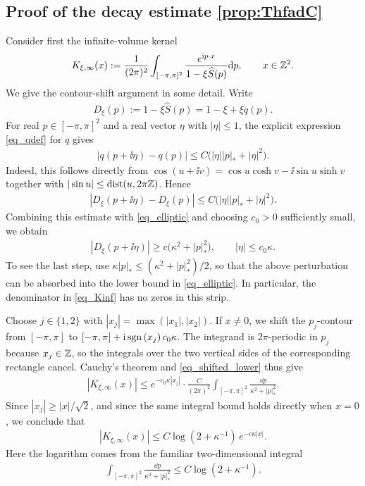 \subsection{Proof of the decay estimate \texorpdfstring{\eqref{prop:ThfadC}}{(5)}}

Consider first the infinite-volume kernel
%
\begin{align}
K_{\xi,\infty}(x):=\frac{1}{(2\pi)^{2}}\int_{[-\pi,\pi]^{2}}\frac{e^{\mathrm{i} p\cdot x}}{1-\xi\widehat{S}(p)}\mathrm{d} p,\qquad x\in\mathbb{Z}^{2}.\label{eq_Kinf}
\end{align}
%
We give the contour-shift argument in some detail. Write
%
\begin{align*}
D_{\xi}(p):=1-\xi\widehat{S}(p)=1-\xi+\xi q(p).
\end{align*}
%
For real $p\in[-\pi,\pi]^{2}$ and a real vector $\eta$ with $|\eta|\leq1$, the explicit expression \eqref{eq_qdef} for $q$ gives
%
\begin{align*}
|q(p+\ii\eta)-q(p)|\leq C\big(|\eta||p|_{*}+|\eta|^{2}\big).
\end{align*}
%
Indeed, this follows directly from $\cos(u+\ii v)=\cos u\cosh v-\ii\sin u\sinh v$ together with $|\sin u|\leq\mathrm{dist}(u,2\pi\mathbb{Z})$. Hence
%
\begin{align*}
|D_{\xi}(p+\ii\eta)-D_{\xi}(p)|\leq C\big(|\eta||p|_{*}+|\eta|^{2}\big).
\end{align*}
%
Combining this estimate with \eqref{eq_elliptic} and choosing $c_{0}>0$ sufficiently small, we obtain
%
\begin{align}
|D_{\xi}(p+\ii\eta)|\geq c\big(\kappa^{2}+|p|_{*}^{2}\big),\qquad |\eta|\leq c_{0}\kappa.\label{eq_shifted_lower}
\end{align}
%
To see the last step, use $\kappa|p|_{*}\leq(\kappa^{2}+|p|_{*}^{2})/2$, so that the above perturbation can be absorbed into the lower bound in \eqref{eq_elliptic}. In particular, the denominator in \eqref{eq_Kinf} has no zeros in this strip.

Choose $j\in\{1,2\}$ with $|x_{j}|=\max(|x_{1}|,|x_{2}|)$. If $x\neq0$, we shift the $p_{j}$-contour from $[-\pi,\pi]$ to $[-\pi,\pi]+\mathrm{i}\,{\operatorname{sgn}\,}(x_{j})\,c_{0}\kappa$. The integrand is $2\pi$-periodic in $p_{j}$ because $x_{j}\in\mathbb{Z}$, so the integrals over the two vertical sides of the corresponding rectangle cancel. Cauchy's theorem and \eqref{eq_shifted_lower} thus give
%
\begin{align*}
|K_{\xi,\infty}(x)|\leq e^{-c_{0}\kappa|x_{j}|}\cdot\frac{C}{(2\pi)^{2}}\int_{[-\pi,\pi]^{2}}\frac{\dd p}{\kappa^{2}+|p|_{*}^{2}}.
\end{align*}
%
Since $|x_{j}|\geq|x|/\sqrt2$, and since the same integral bound holds directly when $x=0$, we conclude that
%
\begin{align}
|K_{\xi,\infty}(x)|\leq C\log(2+\kappa^{-1})\,e^{-c\kappa|x|}.\label{eq_Kinf_bound}
\end{align}
%
Here the logarithm comes from the familiar two-dimensional integral
%
\begin{align}
\int_{[-\pi,\pi]^{2}}\frac{\dd p}{\kappa^{2}+|p|_{*}^{2}}\leq C\log(2+\kappa^{-1}).\label{eq_log_int}
\end{align}

